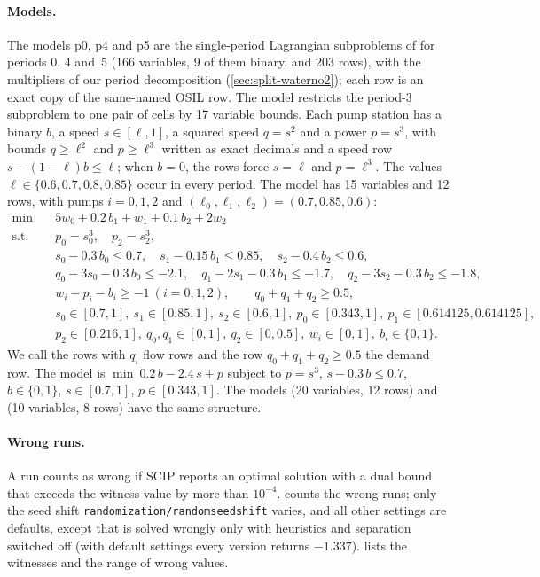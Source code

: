 \paragraph{Models.}
The models p0, p4 and p5 are the single-period Lagrangian subproblems of  for periods 0, 4 and~5 (166 variables, 9 of them binary, and 203 rows), with the multipliers of our period decomposition (\cref{sec:split-waterno2}); each row is an exact copy of the same-named OSIL row.
The model  restricts the period-3 subproblem to one pair of cells by 17 variable bounds.
Each pump station has a binary $b$, a speed $s\in[\ell,1]$, a squared speed $q=s^2$ and a power $p=s^3$, with bounds $q\ge \ell^2$ and $p\ge \ell^3$ written as exact decimals and a speed row $s-(1-\ell)b\le \ell$; when $b=0$, the rows force $s=\ell$ and $p=\ell^3$.
The values $\ell\in\{0.6,0.7,0.8,0.85\}$ occur in every period.
The model  has 15 variables and 12 rows, with pumps $i=0,1,2$ and $(\ell_0,\ell_1,\ell_2)=(0.7,0.85,0.6)$:
\begin{align*}
\min\quad & 5w_0+0.2\,b_1+w_1+0.1\,b_2+2w_2\\
\text{s.t.}\quad & p_0=s_0^3,\quad p_2=s_2^3,\\
& s_0-0.3\,b_0\le0.7,\quad s_1-0.15\,b_1\le0.85,\quad s_2-0.4\,b_2\le0.6,\\
& q_0-3s_0-0.3\,b_0\le-2.1,\quad q_1-2s_1-0.3\,b_1\le-1.7,\quad q_2-3s_2-0.3\,b_2\le-1.8,\\
& w_i-p_i-b_i\ge-1\ (i=0,1,2),\qquad q_0+q_1+q_2\ge0.5,\\
& s_0\in[0.7,1],\ s_1\in[0.85,1],\ s_2\in[0.6,1],\ p_0\in[0.343,1],\ p_1\in[0.614125,0.614125],\\
& p_2\in[0.216,1],\ q_0,q_1\in[0,1],\ q_2\in[0,0.5],\ w_i\in[0,1],\ b_i\in\{0,1\}.
\end{align*}
We call the rows with $q_i$ flow rows and the row $q_0+q_1+q_2\ge0.5$ the demand row.
The model  is $\min\ 0.2\,b-2.4\,s+p$ subject to $p=s^3$, $s-0.3\,b\le0.7$, $b\in\{0,1\}$, $s\in[0.7,1]$, $p\in[0.343,1]$.
The models  (20 variables, 12 rows) and  (10 variables, 8 rows) have the same structure.

\paragraph{Wrong runs.}
A run counts as wrong if SCIP reports an optimal solution with a dual bound that exceeds the witness value by more than $10^{-4}$.
 counts the wrong runs; only the seed shift \texttt{randomization/\allowbreak randomseedshift} varies, and all other settings are defaults, except that  is solved wrongly only with heuristics and separation switched off (with default settings every version returns $-1.337$).
 lists the witnesses and the range of wrong values.

